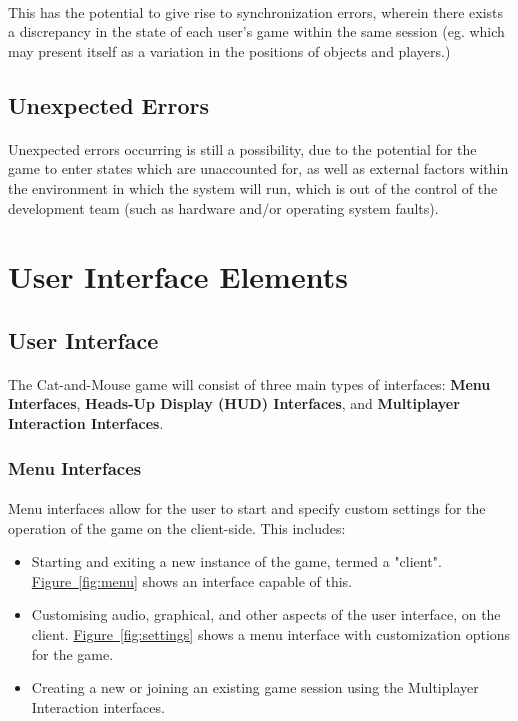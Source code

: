 \documentclass[12pt, titlepage]{article}
\begin{document}
\paragraph{}This has the potential to give rise to synchronization errors, wherein there exists a discrepancy in the state of each user's game within the same session (eg. which may present itself as a variation in the positions of objects and players.)
\subsection{Unexpected Errors}
\paragraph{}Unexpected errors occurring is still a possibility, due to the potential for the game to enter states which are unaccounted for, as well as external factors within the environment in which the system will run, which is out of the control of the development team (such as hardware and/or operating system faults).

\section{User Interface Elements}
\subsection{User Interface}
\paragraph{}The Cat-and-Mouse game will consist of three main types of interfaces: \textbf{Menu Interfaces}, \textbf{Heads-Up Display (HUD) Interfaces}, and \textbf{Multiplayer Interaction Interfaces}.
\subsubsection{Menu Interfaces}
\paragraph{} Menu interfaces allow for the user to start and specify custom settings for the operation of the game on the client-side. This includes:
\begin{itemize}
    \item Starting and exiting a new instance of the game, termed a "client". \hyperref[fig:menu]{Figure~\ref*{fig:menu}} shows an interface capable of this.
    \item Customising audio, graphical, and other aspects of the user interface, on the client. \hyperref[fig:settings]{Figure~\ref*{fig:settings}} shows a menu interface with customization options for the game.
    \item Creating a new or joining an existing game session using the Multiplayer Interaction interfaces. 
\end{itemize}  
\end{document}
